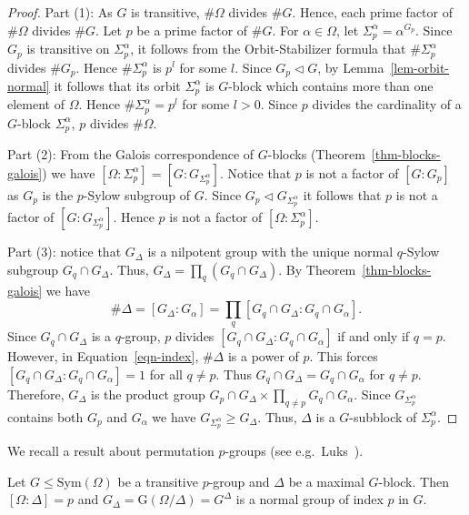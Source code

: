 \documentclass{llncs}
\newcommand{\Gof}[1]{{\ensuremath{\mathrm{G}\left(#1\right)}}}
\newcommand{\Sym}[1]{{\ensuremath{\mathrm{Sym}\left(#1\right)}}}
\begin{document}
\begin{proof}
  Part (1): As $G$ is transitive, $\# \Omega$ divides $\# G$. Hence,
  each prime factor of $\# \Omega$ divides $\# G$. Let $p$ be a prime
  factor of $\# G$. For $\alpha \in \Omega$, let $\Sigma_p^\alpha =
  \alpha^{G_p}$. Since $G_p$ is transitive on $\Sigma_p^\alpha$, it
  follows from the Orbit-Stabilizer formula that $ \# \Sigma_p^\alpha$
  divides $\# G_p$.  Hence $\# \Sigma_p^\alpha$ is $p^l$ for some $l$.
  Since $G_p\lhd G$, by Lemma~\ref{lem-orbit-normal} it follows that
  its orbit $\Sigma_p^\alpha$ is $G$-block which contains more than
  one element of $\Omega$. Hence $\# \Sigma_p^\alpha = p^l$ for some
  $l > 0$.  Since $p$ divides the cardinality of a $G$-block
  $\Sigma_p^\alpha$, $p$ divides $\# \Omega$.

  Part (2): {From} the Galois correspondence of $G$-blocks
  (Theorem~\ref{thm-blocks-galois}) we have $[\Omega :
  \Sigma_p^\alpha] = [G : G_{\Sigma_p^\alpha}]$. Notice that $p$ is
  not a factor of $[G:G_p]$ as $G_p$ is the $p$-Sylow subgroup of $G$.
  Since $G_p \lhd G_{\Sigma_p^\alpha}$ it follows that $p$ is not a
  factor of $[G : G_{\Sigma_p^\alpha}]$.  Hence $p$ is not a factor of
  $[\Omega:\Sigma^\alpha_p]$.

  Part (3): notice that $G_\Delta$ is a nilpotent group with the
  unique normal $q$-Sylow subgroup $G_q \cap G_\Delta$. Thus,
  $G_\Delta = \prod_q (G_q \cap G_\Delta)$. By
  Theorem~\ref{thm-blocks-galois} we have
  \begin{equation}\label{eqn-index}
    \# \Delta = [G_\Delta : G_\alpha ] = \prod_q [ G_q \cap G_\Delta :
      G_q \cap G_\alpha].
  \end{equation}
  Since $G_q \cap G_\Delta$ is a $q$-group, $p$ divides $[G_q \cap
  G_\Delta : G_q \cap G_\alpha]$ if and only if $q = p$. However, in
  Equation~\ref{eqn-index}, $\# \Delta$ is a power of $p$. This forces
  $[G_q \cap G_\Delta :G_q \cap G_\alpha] = 1$ for all $q \neq p$.
  Thus $G_q \cap G_\Delta = G_q \cap G_\alpha$ for $q\neq p$.
  Therefore, $G_\Delta$ is the product group $G_p \cap G_\Delta \times
  \prod_{q \neq p} G_q \cap G_\alpha$. Since $G_{\Sigma_p^\alpha}$
  contains both $G_p$ and $G_\alpha$ we have $G_{\Sigma_p^\alpha} \geq
  G_\Delta$. Thus, $\Delta$ is a $G$-subblock of $\Sigma_p^\alpha$.
\end{proof}  

We recall a result about permutation $p$-groups (see e.g.\
Luks~\cite[Lemma 1.1]{luks82bounded}).

\begin{lemma}\label{lem-luks-pgroups}
  Let $G\leq\Sym{\Omega}$ be a transitive $p$-group and $\Delta$ be a
  maximal $G$-block.  Then $[\Omega : \Delta]=p$ and $G_\Delta =
  \Gof{\Omega/\Delta}=G^{\Delta}$ is a normal group of index $p$ in
  $G$.
\end{lemma}
\end{document}
